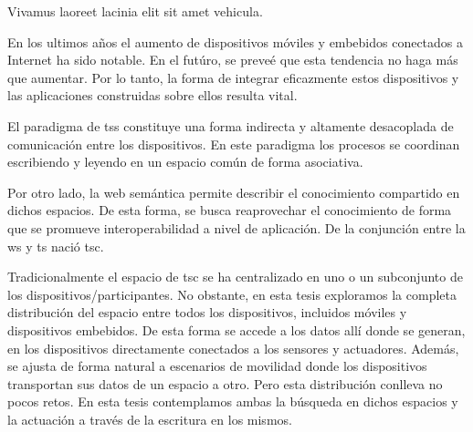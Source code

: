 




\begin{abstracts}        %

Vivamus laoreet lacinia elit sit amet vehicula.

\end{abstracts}



\begin{resumen}        %

En los ultimos años el aumento de dispositivos móviles y embebidos conectados a Internet ha sido notable.
En el futúro, se preveé que esta tendencia no haga más que aumentar.
Por lo tanto, la forma de integrar eficazmente estos dispositivos y las aplicaciones construidas sobre ellos resulta vital.


El paradigma de \aclp{ts} constituye una forma indirecta y altamente desacoplada de comunicación entre los dispositivos.
En este paradigma los procesos se coordinan escribiendo y leyendo en un espacio común de forma asociativa.


Por otro lado, la web semántica permite describir el conocimiento compartido en dichos espacios.
De esta forma, se busca reaprovechar el conocimiento de forma que se promueve interoperabilidad a nivel de aplicación.
De la conjunción entre la \acf{ws} y \acf{ts} nació \ac{tsc}.


Tradicionalmente el espacio de \ac{tsc} se ha centralizado en uno o un subconjunto de los dispositivos/participantes.
No obstante, en esta tesis exploramos la completa distribución del espacio entre todos los dispositivos, incluidos móviles y dispositivos embebidos.
De esta forma se accede a los datos allí donde se generan, en los dispositivos directamente conectados a los sensores y actuadores.
Además, se ajusta de forma natural a escenarios de movilidad donde los dispositivos transportan sus datos de un espacio a otro.
Pero esta distribución conlleva no pocos retos.
En esta tesis contemplamos ambas la búsqueda en dichos espacios y la actuación a través de la escritura en los mismos.



\end{resumen}
